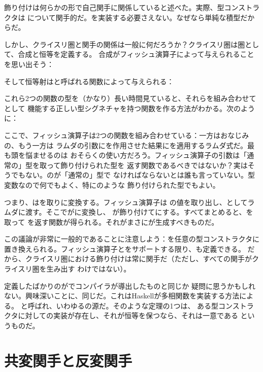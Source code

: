 飾り付けは何らかの形で自己関手に関係していると述べた。実際、型コンストラクタは
について関手的だ。を実装する必要さえない。なぜなら単純な積型だからだ。

しかし、クライスリ圏と関手の関係は一般に何だろうか？クライスリ圏は圏として、合成と恒等を定義する。
合成がフィッシュ演算子によって与えられることを思い出そう：

そして恒等射はと呼ばれる関数によって与えられる：

これら2つの関数の型を（かなり）長い時間見ていると、それらを組み合わせてとして
機能する正しい型シグネチャを持つ関数を作る方法がわかる。次のように：

ここで、フィッシュ演算子は2つの関数を組み合わせている：一方はおなじみの、もう一方は
ラムダの引数にを作用させた結果にを適用するラムダ式だ。最も頭を悩ませるのは
おそらくの使い方だろう。フィッシュ演算子の引数は「通常の」型を取って飾り付けられた型を
返す関数であるべきではないか？実はそうでもない。のが「通常の」型で
なければならないとは誰も言っていない。型変数なので何でもよく、特にのような
飾り付けられた型でもよい。

つまり、はを取りに変換する。フィッシュ演算子は
の値を取り出し、としてラムダに渡す。そこでがに変換し、
が飾り付けてにする。すべてまとめると、を取って
を返す関数が得られる。それがまさにが生成すべきものだ。

この議論が非常に一般的であることに注意しよう：を任意の型コンストラクタに
置き換えられる。フィッシュ演算子とをサポートする限り、も定義できる。
だから、クライスリ圏における飾り付けは常に関手だ（ただし、すべての関手がクライスリ圏を生み出す
わけではない）。

定義したばかりのがでコンパイラが導出したものと同じか
疑問に思うかもしれない。興味深いことに、同じだ。これはHaskellが多相関数を実装する方法による。
と呼ばれ、いわゆるの源だ。そのような定理の1つは、
ある型コンストラクタに対しての実装が存在し、それが恒等を保つなら、それは一意である
というものだ。

\section{共変関手と反変関手}

